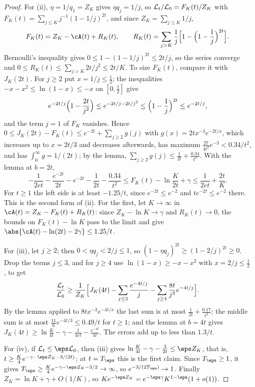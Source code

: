 \begin{refsection}
\begin{proof}
For (ii), $\eta=1/q_1=Z_K$ gives $\eta q_j=1/j$, so $\mathcal{L}_t/\mathcal{L}_0=F_K(t)/Z_K$ with $F_K(t)=\sum_{j\le K}j^{-1}(1-1/j)^{2t}$, and since $Z_K=\sum_{j\le K}1/j$,
\[
  F_K(t)=Z_K-\cA(t)+R_K(t),\qquad R_K(t)=\sum_{j>K}\frac1j\Bigl[1-\Bigl(1-\frac1j\Bigr)^{2t}\Bigr].
\]
Bernoulli's inequality gives $0\le1-(1-1/j)^{2t}\le2t/j$, so the series converge and $0\le R_K(t)\le\sum_{j>K}2t/j^2\le2t/K$. To size $F_K(t)$, compare it with $J_K(2t)$. For $j\ge2$ put $x=1/j\le\frac12$; the inequalities $-x-x^2\le\ln(1-x)\le-x$ on $[0,\frac12]$ give
\[
  e^{-2t/j}\Bigl(1-\frac{2t}{j^2}\Bigr)\le e^{-2t/j-2t/j^2}\le\Bigl(1-\frac1j\Bigr)^{2t}\le e^{-2t/j},
\]
and the term $j=1$ of $F_K$ vanishes. Hence $0\le J_K(2t)-F_K(t)\le e^{-2t}+\sum_{j\ge2}g(j)$ with $g(x)=2tx^{-3}e^{-2t/x}$, which increases up to $x=2t/3$ and decreases afterwards, has maximum $\frac{27}{4t^2}e^{-3}<0.34/t^2$, and has $\int_0^\infty g=1/(2t)$; by the lemma, $\sum_{j\ge2}g(j)\le\frac1{2t}+\frac{0.34}{t^2}$. With the lemma at $b=2t$,
\[
  -\frac1{2et}-\frac{e^{-2t}}{2t}-e^{-2t}-\frac1{2t}-\frac{0.34}{t^2}\le F_K(t)-\ln\frac K{2t}+\gamma\le\frac1{2et}+\frac{2t}K .
\]
For $t\ge1$ the left side is at least $-1.25/t$, since $e^{-2t}\le e^{-2}$ and $te^{-2t}\le e^{-2}$ there. This is the second form of (ii). For the first, let $K\to\infty$ in $\cA(t)=Z_K-F_K(t)+R_K(t)$: since $Z_K-\ln K\to\gamma$ and $R_K(t)\to0$, the bounds on $F_K(t)-\ln K$ pass to the limit and give $\abs{\cA(t)-\ln(2t)-2\gamma}\le1.25/t$.

For (iii), let $j\ge2$; then $0<\eta q_j<2/j\le1$, so $(1-\eta q_j)^{2t}\ge(1-2/j)^{2t}\ge0$. Drop the terms $j\le3$, and for $j\ge4$ use $\ln(1-x)\ge-x-x^2$ with $x=2/j\le\frac12$, to get
\[
  \frac{\mathcal{L}_t}{\mathcal{L}_0}\ge\frac1{Z_K}\Bigl[J_K(4t)-\sum_{j\le3}\frac{e^{-4t/j}}j-\sum_{j\ge4}\frac{8t}{j^3}e^{-4t/j}\Bigr].
\]
By the lemma applied to $8tx^{-3}e^{-4t/x}$ the last sum is at most $\frac1{2t}+\frac{0.17}{t^2}$; the middle sum is at most $\frac{11}6e^{-4t/3}\le0.49/t$ for $t\ge1$; and the lemma at $b=4t$ gives $J_K(4t)\ge\ln\frac K{4t}-\gamma-\frac1{4et}-\frac{e^{-4t}}{4t}$. The errors add up to less than $1.3/t$.

For (iv), if $\Loss_t\le\eps\Loss_0$, then (iii) gives $\ln\frac K{4t}-\gamma-\frac3{2t}\le\eps Z_K$, that is, $t\ge\frac K4e^{-\gamma-\eps Z_K-3/(2t)}$; at $t=T_\eps$ this is the first claim. Since $T_\eps\ge1$, it gives $T_\eps\ge\frac K4e^{-\gamma-\eps Z_K-3/2}\to\infty$, so $e^{-3/(2T_\eps)}\to1$. Finally $Z_K=\ln K+\gamma+O(1/K)$, so $Ke^{-\eps Z_K}=e^{-\eps\gamma}K^{1-\eps}(1+o(1))$.
\end{proof}


\end{refsection}
